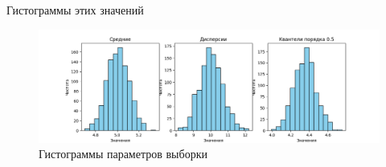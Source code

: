 \documentclass{article}
\begin{document}
Гистограммы этих значений
\begin{figure}[H]
      \centering
      \includegraphics[width=0.8\linewidth]{Python/first-exp.png}
      \caption{Гистограммы параметров выборки}
\end{figure}
\end{document}

